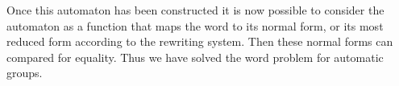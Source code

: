 \documentclass[10pt]{amsart}
\theoremstyle{definition}
\theoremstyle{remark}
\begin{document}
Once this automaton has been constructed it is now possible to consider the
automaton as a function that maps the word to its normal form, or its most
reduced form according to the rewriting system. Then these normal forms can
compared for equality. Thus we have solved the word problem for automatic
groups.

\nocite{*}


\end{document}
